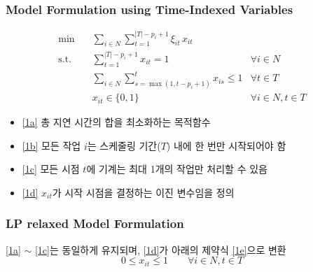 \documentclass[10pt]{article}
\begin{document}
\subsubsection*{Model Formulation using Time-Indexed Variables}
\begin{subequations}
    \begin{align}
        \text{min} \quad & \sum_{i \in N} \sum_{t=1}^{|T|-p_i+1} \xi_{it}\, x_{it} \label{1a}\\
        \text{s.t.} \quad & \sum_{t=1}^{|T|-p_i+1} x_{it} = 1  & \forall i \in N \label{1b}\\
        & \sum_{i \in N} \sum_{s=\max(1, t-p_i+1)}^{t} x_{is} \le 1 & \forall t \in T \label{1c}\\
        & x_{it} \in \{0, 1\} & \forall i \in N, t \in T \label{1d}
    \end{align}
\end{subequations}
\vspace{0.05em}
\begin{itemize} [leftmargin=1em, itemsep=0pt, topsep=1pt]
    \item \eqref{1a} 총 지연 시간의 합을 최소화하는 목적함수
    \item \eqref{1b} 모든 작업 $i$는 스케줄링 기간($T$) 내에 한 번만 시작되어야 함 
    \item \eqref{1c} 모든 시점 $t$에 기계는 최대 1개의 작업만 처리할 수 있음
    \item \eqref{1d} $x_{it}$가 시작 시점을 결정하는 이진 변수임을 정의
    \end{itemize}
\subsubsection*{LP relaxed Model Formulation}
\eqref{1a} $\sim$ \eqref{1c}는 동일하게 유지되며, \eqref{1d}가 아래의 제약식 \eqref{1e}으로 변환
\begin{equation*}
    0 \le x_{it} \le 1 \qquad \forall i \in N, t \in T \tag{1e} \label{1e}
\end{equation*}

\newpage
\end{document}
